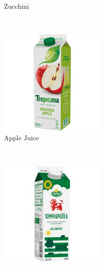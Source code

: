 \begin{figure}[t]
\begin{minipage}[b]{0.47\textwidth}
\begin{subfigure}[t]{0.32\textwidth}
			\caption{Zucchini}
			\label{subfig:clean-image-l}
		\end{subfigure}~ \\[1mm]
		\begin{subfigure}[t]{0.32\textwidth}
			\centering
			\includegraphics[width=\textwidth]{PaperA/clean-image-figure/Tropicana-Apple-Juice_Clean.jpg}
			\caption{Apple Juice}
			\label{subfig:clean-image-n}
		\end{subfigure}~
		\begin{subfigure}[t]{0.32\textwidth}
			\centering
			\includegraphics[width=\textwidth]{PaperA/clean-image-figure/Arla-Milk-Medium-Fat_Clean.jpg}

\end{subfigure}
\end{minipage}
\end{figure}
